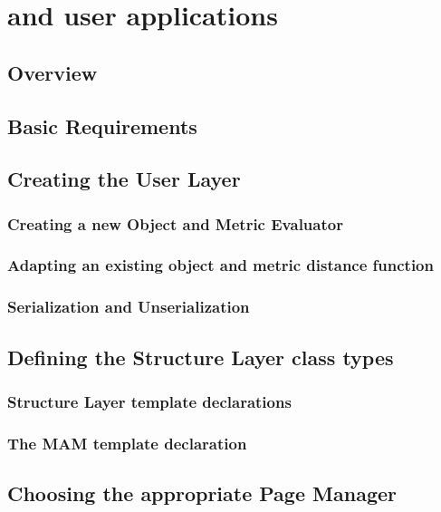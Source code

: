 \chapter{\libname{ }and user applications}
\label{cha:usage}

\section{Overview}

\section{Basic Requirements}

\section{Creating the User Layer}

\subsection{Creating a new Object and Metric Evaluator}

\subsection{Adapting an existing object and metric distance function}

\subsection{Serialization and Unserialization}

\section{Defining the Structure Layer class types}

\subsection{Structure Layer template declarations}

\subsection{The MAM template declaration}

\section{Choosing the appropriate Page Manager}

